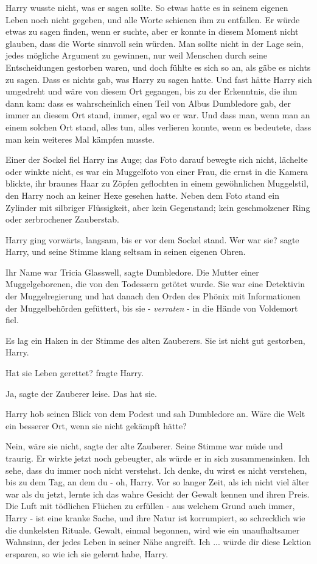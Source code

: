 Harry wusste nicht, was er sagen sollte. So etwas hatte es in seinem eigenen
Leben noch nicht gegeben, und alle Worte schienen ihm zu entfallen. Er würde
etwas zu sagen finden, wenn er suchte, aber er konnte in diesem Moment nicht
glauben, dass die Worte sinnvoll sein würden. Man sollte nicht in der Lage sein,
jedes mögliche Argument zu gewinnen, nur weil Menschen durch seine
Entscheidungen gestorben waren, und doch fühlte es sich so an, als gäbe es
nichts zu sagen. Dass es nichts gab, was Harry zu sagen hatte. Und fast hätte
Harry sich umgedreht und wäre von diesem Ort gegangen, bis zu der Erkenntnis,
die ihm dann kam: dass es wahrscheinlich einen Teil von Albus Dumbledore gab,
der immer an diesem Ort stand, immer, egal wo er war. Und dass man, wenn man an
einem solchen Ort stand, alles tun, alles verlieren konnte, wenn es bedeutete,
dass man kein weiteres Mal kämpfen musste.

Einer der Sockel fiel Harry ins Auge; das Foto darauf bewegte sich nicht,
lächelte oder winkte nicht, es war ein Muggelfoto von einer Frau, die ernst in
die Kamera blickte, ihr braunes Haar zu Zöpfen geflochten in einem gewöhnlichen
Muggelstil, den Harry noch an keiner Hexe gesehen hatte. Neben dem Foto stand
ein Zylinder mit silbriger Flüssigkeit, aber kein Gegenstand; kein geschmolzener
Ring oder zerbrochener Zauberstab.

Harry ging vorwärts, langsam, bis er vor dem Sockel stand. \glqq Wer war
sie?\grqq{} sagte Harry, und seine Stimme klang seltsam in seinen eigenen Ohren.

\glqq Ihr Name war Tricia Glasswell\grqq{}, sagte Dumbledore. \glqq Die Mutter
einer Muggelgeborenen, die von den Todessern getötet wurde. Sie war eine
Detektivin der Muggelregierung und hat danach den Orden des Phönix mit
Informationen der Muggelbehörden gefüttert, bis sie - \emph{verraten} - in die
Hände von Voldemort fiel.\grqq{}

Es lag ein Haken in der Stimme des alten Zauberers. \glqq Sie ist nicht gut
gestorben, Harry.\grqq{}

\glqq Hat sie Leben gerettet?\grqq{} fragte Harry.

\glqq Ja\grqq{}, sagte der Zauberer leise. \glqq Das hat sie.\grqq{}

Harry hob seinen Blick von dem Podest und sah Dumbledore an. \glqq Wäre die Welt
ein besserer Ort, wenn sie nicht gekämpft hätte?\grqq{}

\glqq Nein, wäre sie nicht\grqq{}, sagte der alte Zauberer. Seine Stimme war
müde und traurig. Er wirkte jetzt noch gebeugter, als würde er in sich
zusammensinken. \glqq Ich sehe, dass du immer noch nicht verstehst. Ich denke,
du wirst es nicht verstehen, bis zu dem Tag, an dem du - oh, Harry. Vor so
langer Zeit, als ich nicht viel älter war als du jetzt, lernte ich das wahre
Gesicht der Gewalt kennen und ihren Preis. Die Luft mit tödlichen Flüchen zu
erfüllen - aus welchem Grund auch immer, Harry - ist eine kranke Sache, und ihre
Natur ist korrumpiert, so schrecklich wie die dunkelsten Rituale. Gewalt, einmal
begonnen, wird wie ein unaufhaltsamer Wahnsinn, der jedes Leben in seiner Nähe
angreift. Ich ... würde dir diese Lektion ersparen, so wie ich sie gelernt habe,
Harry.\grqq{}


